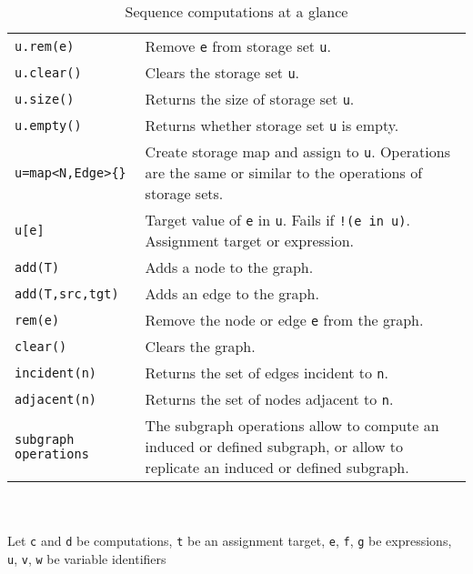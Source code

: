 \begin{table}[htbp]
\begin{minipage}{\linewidth}
\begin{tabularx}{\linewidth}{|lX|}
\texttt{u.rem(e)}	& Remove \texttt{e} from storage set \texttt{u}.\\
\texttt{u.clear()}	& Clears the storage set \texttt{u}.\\
\texttt{u.size()}	& Returns the size of storage set \texttt{u}.\\
\texttt{u.empty()} & Returns whether storage set \texttt{u} is empty.\\
\texttt{u=map<N,Edge>\{\}}	& Create storage map and assign to \texttt{u}. Operations are the same or similar to the operations of storage sets.\\
\texttt{u[e]}	& Target value of \texttt{e} in \texttt{u}. Fails if \texttt{!(e in u)}. Assignment target or expression.\\
\hline
\texttt{add(T)}	& Adds a node to the graph.\\
\texttt{add(T,src,tgt)}	& Adds an edge to the graph.\\
\texttt{rem(e)}	& Remove the node or edge \texttt{e} from the graph.\\
\texttt{clear()}	& Clears the graph.\\
\texttt{incident(n)}	& Returns the set of edges incident to \texttt{n}.\\
\texttt{adjacent(n)} & Returns the set of nodes adjacent to \texttt{n}.\\
\texttt{subgraph operations} & The subgraph operations allow to compute an induced or defined subgraph, or allow to replicate an induced or defined subgraph.\\
\hline
\end{tabularx}
\end{minipage}\\
\\ 
{\small Let \texttt{c} and \texttt{d} be computations, \texttt{t} be an assignment target, \texttt{e}, \texttt{f}, \texttt{g} be expressions, \texttt{u}, \texttt{v}, \texttt{w} be variable identifiers }
\caption{Sequence computations at a glance}
\label{comptab}
\end{table}
 
